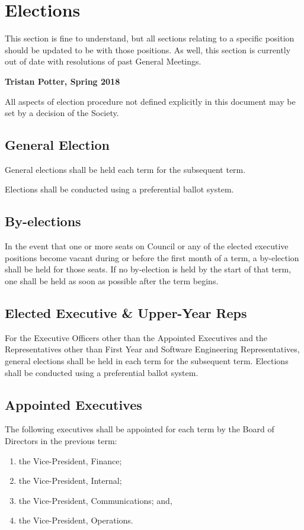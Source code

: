 \section{Elections}
\begin{annotation}
    This section is fine to understand, but all sections relating to a specific
    position should be updated to be with those positions. As well, this 
    section is currently out of date with resolutions of past General Meetings.
    
    \textbf{Tristan Potter, Spring 2018}
\end{annotation}

All aspects of election procedure not defined explicitly in this document may be
set by a decision of the Society.

\subsection{General Election}
General elections shall be held each term for the subsequent term.

Elections shall be conducted using a preferential ballot system.

\subsection{By-elections}
In the event that one or more seats on Council or any of the elected executive
positions become vacant during or before the first month of a term, a by-election shall be held for those seats. If no by-election is held by the start of that
term, one shall be held as soon as possible after the term begins.

\subsection{Elected Executive \& Upper-Year Reps}
For the Executive Officers other than the Appointed Executives and the
Representatives other than First Year and Software Engineering Representatives,
general elections shall be held in each term for the subsequent term. Elections shall be conducted using a preferential ballot system.

\subsection{Appointed Executives}
The following executives shall be appointed for each term by the Board
of Directors in the previous term:
\begin{enumerate} 
    \item the Vice-President, Finance;
    \item the Vice-President, Internal;
    \item the Vice-President, Communications; and,
    \item the Vice-President, Operations.
\end{enumerate}

